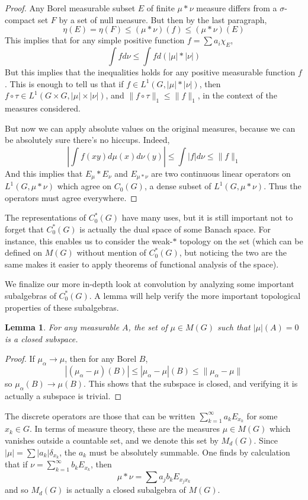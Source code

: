 \documentclass{article}
\theoremstyle{plain}
\newtheorem{lemma}[theorem]{Lemma}
\theoremstyle{definition}
\begin{document}
\begin{proof}
    Any Borel measurable subset $E$ of finite $\mu * \nu$ measure differs from a $\sigma$-compact set $F$ by a set of null measure. But then by the last paragraph,
    \[ \eta(E) = \eta(F) \leq (\mu * \nu)(f) \leq (\mu * \nu)(E) \]
    This implies that for any simple positive function $f = \sum a_i \chi_E$,
    \[ \int f d\nu \leq \int f d(|\mu| * |\nu|) \]
    But this implies that the inequalities holds for any positive measurable function $f$. This is enough to tell us that if $f \in L^1(G, |\mu| * |\nu|)$, then $f \circ \tau \in L^1(G \times G, |\mu| \times |\nu|)$, and $\| f \circ \tau \|_1 \leq \| f \|_1$, in the context of the measures considered.

    But now we can apply absolute values on the original measures, because we can be absolutely sure there's no hiccups. Indeed,
    \[ \left| \int f(xy) d\mu(x) d\nu(y) \right| \leq \int |f| d\nu \leq \| f \|_1 \]
    And this implies that $E_\mu * E_\nu$ and $E_{\mu * \nu}$ are two continuous linear operators on $L^1(G, \mu * \nu)$ which agree on $C_0(G)$, a dense subset of $L^1(G, \mu * \nu)$. Thus the operators must agree everywhere.
\end{proof}

The representations of $C_0^*(G)$ have many uses, but it is still important not to forget that $C_0^*(G)$ is actually the dual space of some Banach space. For instance, this enables us to consider the weak-$*$ topology on the set (which can be defined on $M(G)$ without mention of $C_0^*(G)$, but noticing the two are the same makes it easier to apply theorems of functional analysis of the space).

We finalize our more in-depth look at convolution by analyzing some important subalgebras of $C_0^*(G)$. A lemma will help verify the more important topological properties of these subalgebras.

\begin{lemma}
    For any measurable $A$, the set of $\mu \in M(G)$ such that $|\mu|(A) = 0$ is a closed subspace.
\end{lemma}
\begin{proof}
    If $\mu_\alpha \to \mu$, then for any Borel $B$,
    \[ | (\mu_\alpha - \mu)(B) | \leq |\mu_\alpha - \mu|(B) \leq \| \mu_\alpha - \mu \| \]
    so $\mu_\alpha(B) \to \mu(B)$. This shows that the subspace is closed, and verifying it is actually a subspace is trivial.
\end{proof}

The discrete operators are those that can be written $\sum_{k = 1}^\infty a_k E_{x_k}$ for some $x_k \in G$. In terms of measure theory, these are the measures $\mu \in M(G)$ which vanishes outside a countable set, and we denote this set by $M_d(G)$. Since $|\mu| = \sum |a_k| \delta_{x_k}$, the $a_k$ must be absolutely summable. One finds by calculation that if $\nu = \sum_{k = 1}^\infty b_k E_{x_k}$, then
%
\[ \mu * \nu = \sum a_j b_k E_{x_j x_k} \]
%
and so $M_d(G)$ is actually a closed subalgebra of $M(G)$.
\end{document}
